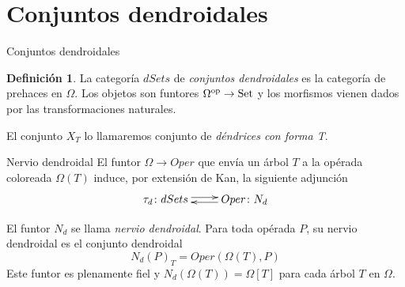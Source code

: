 \documentclass[12pt,aspectratio=169]{beamer}
\numberwithin{equation}{section}
\theoremstyle{definition}
\newtheorem{defi}[teo]{Definici\'on}
\newcommand{\Set}{\mathop{\rm Set}}
\begin{document}
{\section{Conjuntos dendroidales}
\begin{frame}{Conjuntos dendroidales}
    \begin{defi}
        La categor\'ia $dSets$ de \emph{conjuntos dendroidales} es la categor\'ia de prehaces en $\Omega$. Los objetos son funtores $\Omega^{\rm op}\to\Set$ y los morfismos vienen dados por las transformaciones naturales. %


        El conjunto $X_T$ lo llamaremos conjunto de \emph{d\'endrices con forma T}. %


    \end{defi}
\end{frame}
\begin{frame}{Nervio dendroidal}
    El funtor $\Omega \to Oper$ que env\'ia un \'arbol $T$ a la op\'erada coloreada $\Omega(T)$ induce, por extensi\'on de Kan, la siguiente adjunci\'on
    \[
        \xymatrix{
            \tau_d\colon dSets\ar@<0.5ex>[r] &  Oper\colon N_d \ar@<0.5ex>[l]
        }
    \]

    El funtor $N_d$ se llama \emph{nervio dendroidal}. Para toda op\'erada $P$, su nervio dendroidal es el conjunto dendroidal
    $$
        N_d(P)_T = Oper(\Omega(T), P)
    $$
    Este funtor es plenamente fiel y $N_d(\Omega(T))=\Omega[T]$ para cada \'arbol $T$ en $\Omega$.
\end{frame}
}
\end{document}
